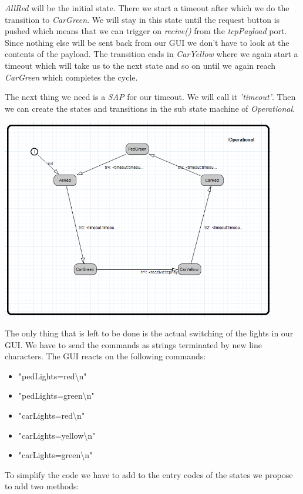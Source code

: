 \textit{AllRed} will be the initial state. There we start a timeout after which we do the transition
to \textit{CarGreen}. We will stay in this state until the request button is pushed which means that we can trigger
on \textit{recive()} from the \textit{tcpPayload} port. Since nothing else will be sent back from our GUI we don't have
to look at the contents of the payload. The transition ends in \textit{CarYellow} where we again start a timeout
which will take us to the next state and so on until we again reach \textit{CarGreen} which completes the cycle.

The next thing we need is a \textit{SAP} for our timeout. We will call it \textit{'timeout'}.
Then we can create the states and transitions in the sub state machine of \textit{Operational}.

\includegraphics[width=0.9\textwidth]{images/018-operational.png}

The only thing that is left to be done is the actual switching of the lights in our GUI.
We have to send the commands as strings terminated by new line characters.
The GUI reacts on the following commands:

\begin{itemize}
\item "pedLights=red\textbackslash{}n"
\item "pedLights=green\textbackslash{}n"
\item "carLights=red\textbackslash{}n"
\item "carLights=yellow\textbackslash{}n"
\item "carLights=green\textbackslash{}n"
\end{itemize}

To simplify the code we have to add to the entry codes of the states we propose to add two methods:

